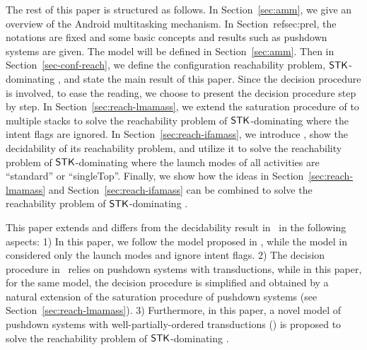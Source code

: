 The rest of this paper is structured as follows. In Section~\ref{sec:amm}, we give an overview of the Android multitasking mechanism. In Section~ref{sec:prel}, the notations are fixed and some basic concepts and results such as pushdown systems are given. 
The {\AMASS} model will be defined in Section~\ref{sec:amm}. Then in Section~\ref{sec-conf-reach}, we define the configuration reachability problem, $\mathsf{STK}$-dominating {\AMASS}, and state the main result of this paper. Since the decision procedure is involved, to ease the reading, we choose to present the decision procedure step by step. In Section~\ref{sec:reach-lmamass}, we extend the saturation procedure of {\PDS} to multiple stacks to solve the reachability problem of $\mathsf{STK}$-dominating {\AMASS} where the intent flags are ignored. 
In Section~\ref{sec:reach-ifamass}, we introduce {\WOTrPDS}, show the decidability of its reachability problem, and utilize it to solve the reachability problem of $\mathsf{STK}$-dominating {\AMASS} where the launch modes of all activities are ``standard'' or ``singleTop''. Finally, we show how the ideas in Section~\ref{sec:reach-lmamass} and Section~\ref{sec:reach-ifamass} can be combined to solve the reachability problem of $\mathsf{STK}$-dominating {\AMASS}. 

This paper extends and differs from the decidability result in~\cite{CHS+18} in the following aspects: 1) In this paper, we follow the {\AMASS} model proposed in \cite{HC+19}, while the model in~\cite{CHS+18} considered only the launch modes and ignore intent flags. 2) The decision procedure in~\cite{CHS+18} relies on pushdown systems with transductions, while in this paper, for the same model, the decision procedure is simplified and obtained by a natural extension of the saturation procedure of pushdown systems (see Section~\ref{sec:reach-lmamass}). 3) Furthermore, in this paper, a novel model of pushdown systems with well-partially-ordered transductions (\WOTrPDS) is proposed to solve the reachability problem of $\mathsf{STK}$-dominating {\AMASS}.  
